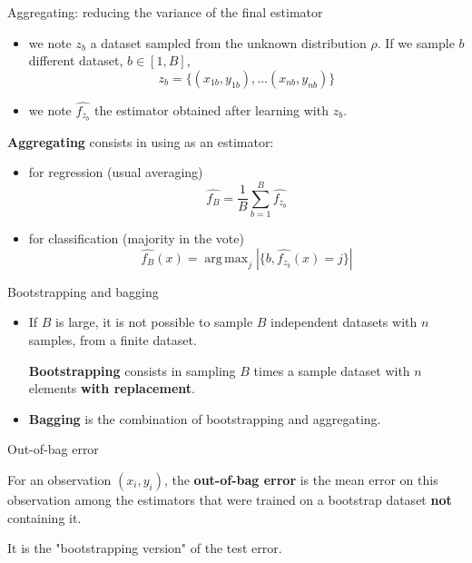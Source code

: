 \documentclass[usenames,dvipsnames]{beamer}
\DeclareMathOperator*{\argmax}{arg\,max}
\begin{document}
\begin{frame}{Aggregating: reducing the variance of the final estimator}
    \begin{itemize}
	\item we note $z_b$ a dataset sampled from the unknown distribution $ \rho$. If we sample $b$ different dataset, $b\in [1, B]$, 
	    \begin{equation}
		z_b = \{(x_{1b}, y_{1b}), \dots (x_{nb}, y_{nb})\}
	    \end{equation}
	\item we note $ \hat{f_{z_b}}$ the estimator obtained after learning with $ z_b$.
    \end{itemize}
    \textbf{{Aggregating}} consists in using as an estimator:
    \begin{itemize}
	\item for regression (usual averaging)
	    \begin{equation}
		\hat{f_B} = \frac{1}{B} \sum^{B}_{b=1} \hat{f_{z_b}}
	    \end{equation}
	\item for classification (majority in the vote)
	    \begin{equation}
		\hat{f_B}(x) = \argmax_{j} | \{ b, \hat{f_{z_b}}(x)=j \}|
	    \end{equation}
    \end{itemize}
\end{frame}

\begin{frame}{Bootstrapping and bagging}
    \begin{itemize}
    	\item If $B$ is large, it is not possible to sample $B$ independent datasets with $n$ samples, from a finite dataset.

    \textbf{{Bootstrapping}} consists in sampling $B$ times a sample dataset with $n$ elements \textbf{{with replacement}}.
	\item \textbf{{Bagging}} is the combination of bootstrapping and aggregating.
    \end{itemize}
    
\end{frame}

\begin{frame}{Out-of-bag error}
    
    For an observation $(x_i, y_i)$, the \textbf{{out-of-bag error}}  is the mean error on this observation among the estimators that were trained on a bootstrap dataset \textbf{{not}} containing it.

    It is the "bootstrapping version" of the test error.
\end{frame}
\end{document}
